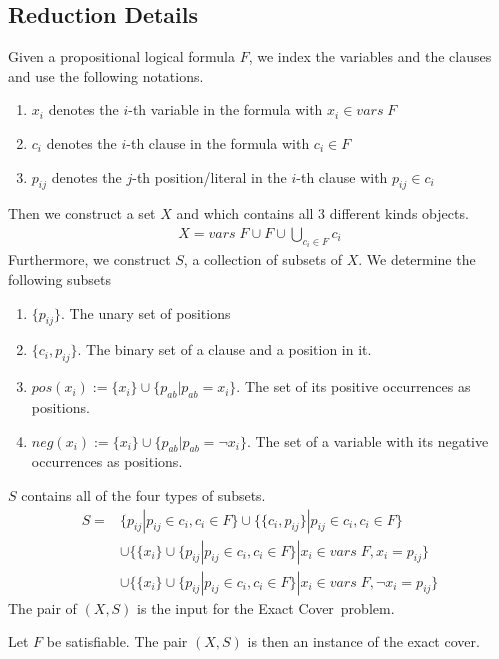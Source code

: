 \subsection{Reduction Details}
Given a propositional logical formula $F$, we index the variables and the clauses and use the following notations.
\begin{enumerate}
    \item $x_i$ denotes the $i$-th variable in the formula with $x_i \in vars\; F$
    \item $c_i$ denotes the $i$-th clause in the formula with $c_i \in F$
    \item $p_{ij}$ denotes the $j$-th position/literal in the $i$-th clause with $p_{ij} \in c_i$
\end{enumerate} 
Then we construct a set $X$ and which contains all 3 different kinds objects. 
\begin{align*}
    X = vars\; F \cup F \cup \bigcup_{c_i \in F} c_i
\end{align*}
Furthermore, we construct $S$, a collection of subsets of $X$. We determine the following subsets
\begin{enumerate}
    \item $\{p_{ij}\}$. The unary set of positions
    \item $\{c_i, p_{ij}\}$. The binary set of a clause and a position in it.
    \item $pos(x_i) := \{x_i\} \cup \{p_{ab} | p_{ab} = x_i\}$. The set of its positive occurrences as positions.
    \item $neg(x_i):= \{x_i\} \cup \{p_{ab} | p_{ab} = \neg x_i\}$. The set of a variable with  its negative occurrences as positions.
\end{enumerate}
$S$ contains all of the four types of subsets.
\begin{align*}
    S =& \{{p_{ij}} | p_{ij} \in c_i, c_i \in F \} 
    \cup \{\{c_i, p_{ij}\} | p_{ij} \in c_i, c_i \in F \} \\
    &\cup \{\{x_i\} \cup \{p_{ij} | p_{ij} \in c_i, c_i \in F\} | x_i \in vars\; F, x_i = p_{ij}\}\\
    &\cup \{\{x_i\} \cup \{p_{ij} | p_{ij} \in c_i, c_i \in F\} | x_i \in vars\; F, \neg x_i = p_{ij}\}
\end{align*}
The pair of $(X, S)$ is the input for the Exact Cover\ problem. 
\begin{lemma}[Soundess]
    Let $F$ be satisfiable. The pair $(X, S)$ is then an instance of the exact cover.
\end{lemma}
